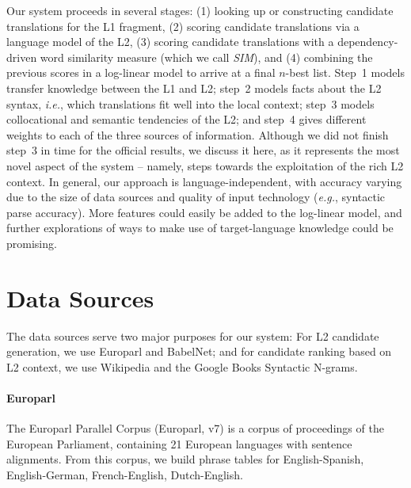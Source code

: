 \documentclass[11pt]{article}
\begin{document}
Our system proceeds in several stages: (1) looking up or constructing candidate
translations for the L1 fragment, (2) scoring candidate translations via a
language model of the L2, (3) scoring candidate translations with a
dependency-driven word similarity measure \cite{lin:98} (which we call
\textit{SIM}), and (4) combining the previous scores in a log-linear model to
arrive at a final $n$-best list.  Step~1 models transfer knowledge between the L1
and L2; step~2 models facts about the L2 syntax, \emph{i.e.}, which
translations fit well into the local context; step~3 models collocational and
semantic tendencies of the L2; and step~4 gives different weights to each of
the three sources of information.  Although we did not finish step~3 in time
for the official results, we discuss it here, as it represents the most novel
aspect of the system -- namely, steps towards the exploitation of the rich L2
context. In general, our approach is language-independent, with accuracy
varying due to the size of data sources and quality of input technology
(\emph{e.g.}, syntactic parse accuracy). More features could easily be added to
the log-linear model, and further explorations of ways to make use of
target-language knowledge could be promising.

\section{Data Sources}
The data sources serve two major purposes for our system: For L2 candidate generation, we use Europarl and BabelNet; and for candidate ranking based on L2 context, we use Wikipedia and the Google Books Syntactic N-grams. 

\paragraph{Europarl}  %
The Europarl Parallel Corpus (Europarl, v7) \cite{koehn:05} is a corpus of proceedings of the European Parliament, containing 21 European languages with sentence alignments.
From this corpus, we build phrase tables for English-Spanish, English-German, French-English, Dutch-English.
\end{document}
